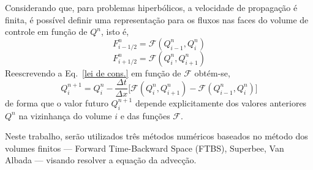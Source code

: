 Considerando que, para problemas hiperbólicos, a velocidade de propagação é
finita, é possível definir uma representação para os fluxos nas faces do volume
de controle em função de $Q^n$, isto é,
\[
    F_{i-1/2}^n = \mathcal{F}(Q_{i-1}^n, Q_i^n)
\]
\[
    F_{i+1/2}^n = \mathcal{F}(Q_i^n, Q_{i+1}^n)
\]
Reescrevendo a Eq.\ \ref{lei de cons.} em função de $\mathcal{F}$ obtém-se,
\begin{equation}\label{vol. fin.}
    Q_i^{n+1} = Q_i^n - \frac{\Delta t}{\Delta x}\bigg[
        \mathcal{F}(Q_i^n,Q_{i+1}^n) - \mathcal{F}(Q_{i-1}^n,Q_i^n)
    \bigg]
\end{equation}
de forma que o valor futuro $Q_i^{n+1}$ depende explicitamente dos valores
anteriores $Q^n$ na vizinhança do volume $i$ e das funções $\mathcal{F}$.

Neste trabalho, serão utilizados três métodos numéricos baseados no método
dos volumes finitos --- Forward Time-Backward Space (FTBS),\linebreak
Superbee, Van Albada --- visando resolver a equação da advecção.